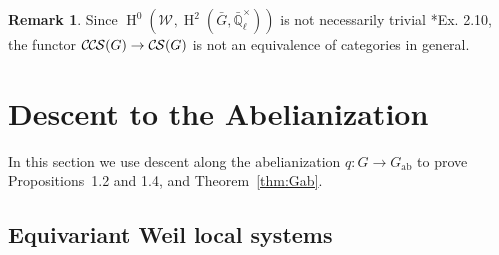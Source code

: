 \documentclass[10pt]{amsart}
\theoremstyle{plain}
\theoremstyle{definition}
\newtheorem{remark}[theorem]{Remark}
\newcommand{\EE}{\mathbb{\bar Q}_\ell}
\newcommand{\EEx}{\EE^\times}
\newcommand{\Weil}[1]{\mathcal{W}_{#1}}
\DeclareMathOperator{\Hh}{H}
\newcommand{\ab}{_{\operatorname{ab}}}
\newcommand{\CS}{{\mathcal{C\hskip-0.8pt S}}}
\newcommand{\CCS}{{\mathcal{C\hskip-.8pt C\hskip-0.8pt S}}}
\newcommand{\bG}{\bar{G}}
\begin{document}
\begin{remark}
Since $\Hh^0(\Weil{},\Hh^2(\bG,\EEx))$ is not necessarily trivial \cite{cunningham-roe:13a}*{Ex. 2.10}, the functor
$\CCS(G) \to \CS(G)$ is not an equivalence of categories in general.
\end{remark}


\section{Descent to the Abelianization} \label{sec:descent}

In this section we use descent along the abelianization $q : G \to G\ab$ to prove Propositions~1.2 and 1.4, and Theorem~\ref{thm:Gab}.

\subsection{Equivariant Weil local systems}
\end{document}

